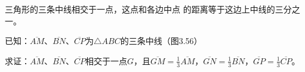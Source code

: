 \begin{figure}
    \begin{minipage}[t]{0.48\linewidth}
    \centering
\begin{tikzpicture}[>=latex, scale=.8]
    \end{tikzpicture}
    \caption{}
    \end{minipage}
    \begin{minipage}[t]{0.48\linewidth}
    \centering
    \begin{tikzpicture}[>=latex, scale=1]
    \end{tikzpicture}
    \caption{}
    \end{minipage}
    \end{figure}


\begin{example}
    三角形的三条中线相交于一点，这点和各边中点
    的距离等于这边上中线的三分之一。
\end{example}

已知：$\overline{AM}$、$\overline{BN}$、$\overline{CP}$为$\triangle ABC$的三条中线（图3.56）

求证：$\overline{AM}$、$\overline{BN}$、$\overline{CP}$相交于一点$G$，且$\overline{GM}=\frac{1}{3}\overline{AM}$，$\overline{GN}=\frac{1}{3}\overline{BN}$，$\overline{GP}=\frac{1}{3}\overline{CP}$。

